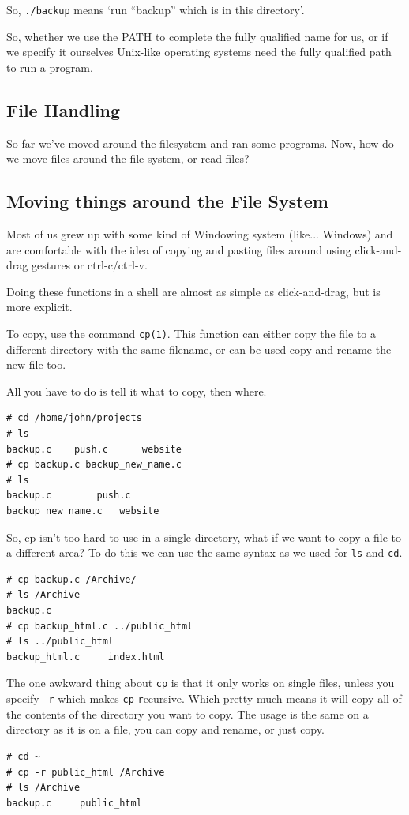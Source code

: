 So, {\tt ./backup} means `run ``backup'' which is in this directory'.

So, whether we use the PATH to complete the fully qualified name for us, or if we specify it ourselves
Unix-like operating systems need the fully qualified path to run a program.

\subsection {File Handling}
So far we've moved around the filesystem and ran some programs. Now, how do we move
files around the file system, or read files?

\subsection{Moving things around the File System}
Most of us grew up with some kind of Windowing system (like... Windows)
and are comfortable with the idea of copying and pasting files around 
using click-and-drag gestures or ctrl-c/ctrl-v.

Doing these functions in a shell are almost as simple as 
click-and-drag, but is more explicit.

To copy, use the command {\tt cp(1)}. This function can either copy the file to a different 
directory with the same filename, or can be used copy and rename the new file too.

All you have to do is tell it what to copy, then where. 

{\tt \begin{verbatim}
# cd /home/john/projects
# ls
backup.c	push.c		website
# cp backup.c backup_new_name.c
# ls
backup.c		push.c
backup_new_name.c	website
\end{verbatim}
}

So, cp isn't too hard to use in a single directory, what if we want to copy a file to a
different area? To do this we can use the same syntax as we used for {\tt ls} and {\tt cd}.
{\tt \begin{verbatim}
# cp backup.c /Archive/
# ls /Archive
backup.c
# cp backup_html.c ../public_html
# ls ../public_html
backup_html.c     index.html
\end{verbatim}
}

The one awkward thing about {\tt cp} is that it only works on single files,
unless you specify {\tt -r} which makes {\tt cp} {\tt r}ecursive.  Which
pretty much means it will copy all of the contents of the directory you
want to copy. The usage is the same on a directory as it is on a file,
you can copy and rename, or just copy.
{\tt \begin{verbatim}
# cd ~
# cp -r public_html /Archive
# ls /Archive
backup.c     public_html
\end{verbatim}
}

